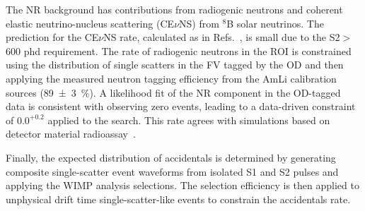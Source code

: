 The NR background has contributions from radiogenic neutrons and coherent elastic neutrino-nucleus scattering (CE$\nu$NS) from $^8$B solar neutrinos. The prediction for the CE$\nu$NS rate, calculated as in Refs.~\cite{baxter2021recommended, Agostini2019Simultaneous, vinyoles2017new, aharmin2013combined}, is small due to the S2$>$600 phd requirement. The rate of radiogenic neutrons in the ROI is constrained using the distribution of single scatters in the FV tagged by the OD and then applying the measured neutron tagging efficiency from the AmLi calibration sources (\SI{89(3)}{\percent}). A likelihood fit of the NR component in the OD-tagged data is consistent with observing zero events, leading to a data-driven constraint of $0.0^{+0.2}$ applied to the search. This rate agrees with simulations based on detector material radioassay~\cite{akerib2020cleanliness}.


Finally, the expected distribution of accidentals is determined by generating composite single-scatter event waveforms from isolated S1 and S2 pulses and applying the WIMP analysis selections. The selection efficiency is then applied to unphysical drift time single-scatter-like events to constrain the accidentals rate.
